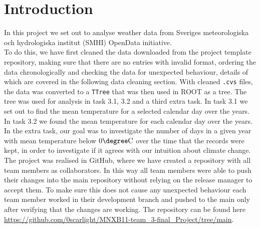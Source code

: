 \documentclass[../main.tex]{subfiles}
\begin{document}
\section{Introduction}
In this project we set out to analyse weather data from Sveriges meteorologiska och hydrologiska institut (SMHI) OpenData initiative. \\

To do this, we have first cleaned the data downloaded from the project template repository, making sure that there are no entries with invalid format, ordering the data chronologically and checking the data for unexpected behaviour, details of which are covered in the following data cleaning section. With cleaned \verb|.cvs| files, the data was converted to a \verb|TTree| that was then used in ROOT as a tree. The tree was used for analysis in task 3.1, 3.2 and a third extra task. In task 3.1 we set out to find the mean temperature for a selected calendar day over the years. In task 3.2 we found the mean temperature for each calendar day over the years. In the extra task, our goal was to investigate the number of days in a given year with mean temperature below $0\degree\text{C}$ over the time that the records were kept, in order to investigate if it agrees with our intuition about climate change. \\

The project was realised in GitHub, where we have created a repository with all team members as collaborators. In this way all team members were able to push their changes into the main repository without relying on the release manager to accept them. To make sure this does not cause any unexpected behaviour each team member worked in their development branch and pushed to the main only after verifying that the changes are working. The repository can be found here \url{https://github.com/0scarlight/MNXB11-team_3-final_Project/tree/main}.
\end{document}

